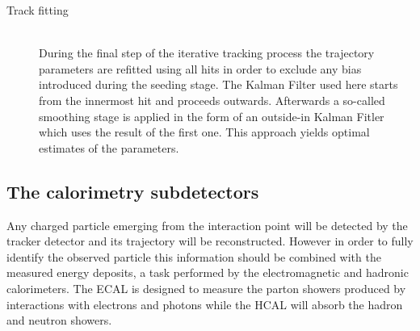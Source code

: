 \begin{myindentpar}
\begin{description}
    \item[Track fitting] \hfill \\
    During the final step of the iterative tracking process the trajectory parameters are refitted using all hits in order to exclude any bias introduced during the seeding stage. The Kalman Filter used here starts from the innermost hit and proceeds outwards. Afterwards a so-called smoothing stage is applied in the form of an outside-in Kalman Fitler which uses the result of the first one. This approach yields optimal estimates of the parameters.
  \end{description}
\end{myindentpar}

\subsection{The calorimetry subdetectors}\label{sec::CAL}

Any charged particle emerging from the interaction point will be detected by the tracker detector and its trajectory will be reconstructed. However in order to fully identify the observed particle this information should be combined with the measured energy deposits, a task performed by the electromagnetic and hadronic calorimeters. The ECAL is designed to measure the parton showers produced by interactions with electrons and photons while the HCAL will absorb the hadron and neutron showers.

